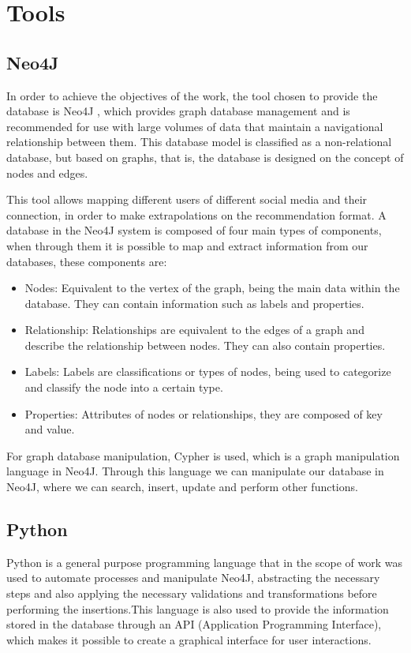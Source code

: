 \chapter{Tools}

\section{Neo4J}

In order to achieve the objectives of the work, the tool chosen to provide the database is Neo4J \cite{neo4j}, which provides graph database management and is recommended for use with large volumes of data that maintain a navigational relationship between them. This database model is classified as a non-relational database, but based on graphs, that is, the database is designed on the concept of nodes and edges.

This tool allows mapping different users of different social media and their connection, in order to make extrapolations on the recommendation format. A database in the Neo4J system is composed of four main types of components, when through them it is possible to map and extract information from our databases, these components are:
\begin{itemize}
  \item Nodes: Equivalent to the vertex of the graph, being the main data within the database. They can contain information such as labels and properties.
  \item Relationship: Relationships are equivalent to the edges of a graph and describe the relationship between nodes. They can also contain properties.
  \item Labels: Labels are classifications or types of nodes, being used to categorize and classify the node into a certain type.
  \item Properties: Attributes of nodes or relationships, they are composed of key and value.
\end{itemize}
 
For graph database manipulation, Cypher \cite{cypher} is used, which is a graph manipulation language in Neo4J. Through this language we can manipulate our database in Neo4J, where we can search, insert, update and perform other functions.

\section{Python}
Python \cite{python} is a general purpose programming language that in the scope of work was used to automate processes and manipulate Neo4J, abstracting the necessary steps and also applying the necessary validations and transformations before performing the insertions.This language is also used to provide the information stored in the database through an API (Application Programming Interface), 
which makes it possible to create a graphical interface for user interactions.

